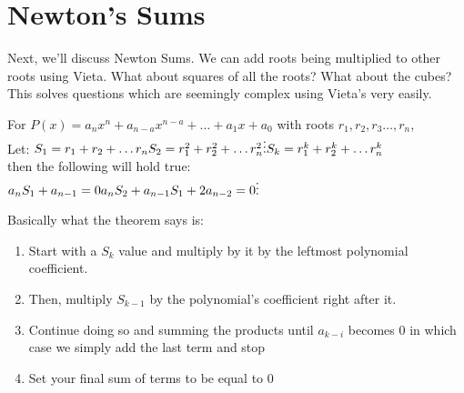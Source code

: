 \section{Newton's Sums}
Next, we'll discuss Newton Sums. We can add roots being multiplied to other roots using Vieta. What about squares of all the roots? What about the cubes? This solves questions which are seemingly complex using Vieta's very easily.\\
\begin{theorem}
    For $P(x)=a_nx^n+a_{n-a}x^{n-a}+\dots+a_1x+a_0$ with roots $r_1, r_2, r_3 \dots, r_n$,\\
    Let: $S_1=r_1+r_2+\dots r_n\\
    S_2=r_1^2+r_2^2+\dots r_n^2\\
    \vdots\\
    S_k=r_1^k+r_2^k+\dots r_n^k$\\
    then the following will hold true:\\
    $a_nS_1+a_{n-1}=0\\
    a_nS_2+a_{n-1}S_1+2a_{n-2}=0\\
    \vdots$
\end{theorem}
Basically what the theorem says is:
\begin{enumerate}
    \item Start with a $S_k$ value and multiply by it by the leftmost polynomial coefficient.
    \item Then, multiply $S_{k-1}$ by the polynomial’s coefficient right after it.
    \item Continue doing so and summing the products until $a_{k-i}$ becomes 0 in which case we simply add the last term and stop
    \item Set your final sum of terms to be equal to 0
\end{enumerate}
